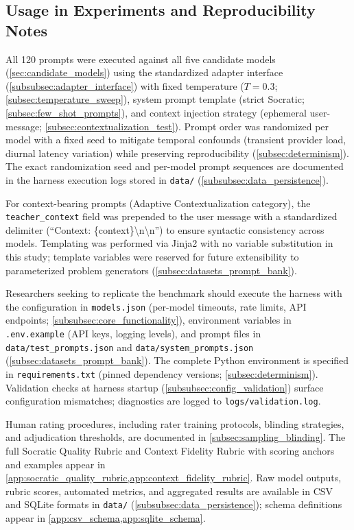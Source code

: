 \subsection{Usage in Experiments and Reproducibility Notes}
\label{app:prompts_usage}

All 120 prompts were executed against all five candidate models (\cref{sec:candidate_models}) using the standardized adapter interface (\cref{subsubsec:adapter_interface}) with fixed temperature ($T=0.3$; \cref{subsec:temperature_sweep}), system prompt template (strict Socratic; \cref{subsec:few_shot_prompts}), and context injection strategy (ephemeral user-message; \cref{subsec:contextualization_test}). Prompt order was randomized per model with a fixed seed to mitigate temporal confounds (transient provider load, diurnal latency variation) while preserving reproducibility (\cref{subsec:determinism}). The exact randomization seed and per-model prompt sequences are documented in the harness execution logs stored in \texttt{data/} (\cref{subsubsec:data_persistence}).

For context-bearing prompts (Adaptive Contextualization category), the \texttt{teacher\_context} field was prepended to the user message with a standardized delimiter (``Context: \{context\}\textbackslash{}n\textbackslash{}n'') to ensure syntactic consistency across models. Templating was performed via Jinja2 with no variable substitution in this study; template variables were reserved for future extensibility to parameterized problem generators (\cref{subsec:datasets_prompt_bank}).

Researchers seeking to replicate the benchmark should execute the harness with the configuration in \texttt{models.json} (per-model timeouts, rate limits, API endpoints; \cref{subsubsec:core_functionality}), environment variables in \texttt{.env.example} (API keys, logging levels), and prompt files in \texttt{data/test\_prompts.json} and \texttt{data/system\_prompts.json} (\cref{subsec:datasets_prompt_bank}). The complete Python environment is specified in \texttt{requirements.txt} (pinned dependency versions; \cref{subsec:determinism}). Validation checks at harness startup (\cref{subsubsec:config_validation}) surface configuration mismatches; diagnostics are logged to \texttt{logs/validation.log}.

Human rating procedures, including rater training protocols, blinding strategies, and adjudication thresholds, are documented in \cref{subsec:sampling_blinding}. The full Socratic Quality Rubric and Context Fidelity Rubric with scoring anchors and examples appear in \cref{app:socratic_quality_rubric,app:context_fidelity_rubric}. Raw model outputs, rubric scores, automated metrics, and aggregated results are available in CSV and SQLite formats in \texttt{data/} (\cref{subsubsec:data_persistence}); schema definitions appear in \cref{app:csv_schema,app:sqlite_schema}.
